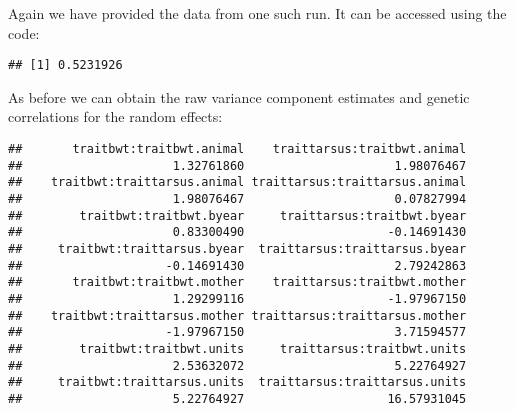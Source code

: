 \documentclass[
  12pt,
]{book}
\newenvironment{Shaded}{\begin{snugshade}}{\end{snugshade}}
\newcommand{\AttributeTok}[1]{\textcolor[rgb]{0.77,0.63,0.00}{#1}}
\newcommand{\DecValTok}[1]{\textcolor[rgb]{0.00,0.00,0.81}{#1}}
\newcommand{\FloatTok}[1]{\textcolor[rgb]{0.00,0.00,0.81}{#1}}
\newcommand{\FunctionTok}[1]{\textcolor[rgb]{0.00,0.00,0.00}{#1}}
\newcommand{\NormalTok}[1]{#1}
\newcommand{\SpecialCharTok}[1]{\textcolor[rgb]{0.00,0.00,0.00}{#1}}
\newcommand{\StringTok}[1]{\textcolor[rgb]{0.31,0.60,0.02}{#1}}
\begin{document}
Again we have provided the data from one such run. It can be accessed using the code:

\begin{Shaded}
\end{Shaded}

\begin{verbatim}
## [1] 0.5231926
\end{verbatim}

As before we can obtain the raw variance component estimates and genetic correlations for the random effects:

\begin{Shaded}
\end{Shaded}

\begin{verbatim}
##       traitbwt:traitbwt.animal    traittarsus:traitbwt.animal 
##                     1.32761860                     1.98076467 
##    traitbwt:traittarsus.animal traittarsus:traittarsus.animal 
##                     1.98076467                     0.07827994 
##        traitbwt:traitbwt.byear     traittarsus:traitbwt.byear 
##                     0.83300490                    -0.14691430 
##     traitbwt:traittarsus.byear  traittarsus:traittarsus.byear 
##                    -0.14691430                     2.79242863 
##       traitbwt:traitbwt.mother    traittarsus:traitbwt.mother 
##                     1.29299116                    -1.97967150 
##    traitbwt:traittarsus.mother traittarsus:traittarsus.mother 
##                    -1.97967150                     3.71594577 
##        traitbwt:traitbwt.units     traittarsus:traitbwt.units 
##                     2.53632072                     5.22764927 
##     traitbwt:traittarsus.units  traittarsus:traittarsus.units 
##                     5.22764927                    16.57931045
\end{verbatim}
\end{document}
